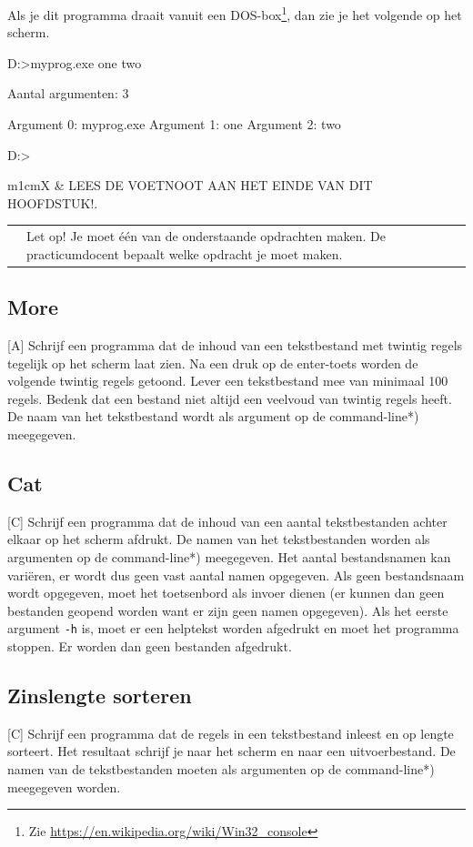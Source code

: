 \documentclass[a4paper,10pt,fleqn,twoside]{article}
\newcommand{\letop}{%
\vspace{4ex plus 1ex minus 1ex}
\begin{mdframed}[outerlinewidth = 1 ,%
roundcorner = 4 pt,%
leftmargin = 40,%
rightmargin = 40,%
backgroundcolor = yellow!40,%
outerlinecolor = red!70!black,%
innertopmargin = \topskip,%
splittopskip = \topskip,%
]
\begin{tabularx}{\linewidth}{m{1cm}X}
\Large\leftpointright & Let op! Je moet één van de onderstaande opdrachten maken. De practicumdocent bepaalt welke opdracht je moet maken.
\end{tabularx}
\end{mdframed}
\vspace{4ex plus 1ex minus 1ex}
}
\newcommand{\leesvoetnoot}{%
\vspace{4ex plus 1ex minus 1ex}
\begin{mdframed}[outerlinewidth = 1 ,%
roundcorner = 4 pt,%
leftmargin = 40,%
rightmargin = 40,%
backgroundcolor = yellow!40,%
outerlinecolor = red!70!black,%
innertopmargin = \topskip,%
splittopskip = \topskip,%
]
\begin{tabularx}{\linewidth}{m{1cm}X}
\Large\leftpointright & LEES DE VOETNOOT AAN HET EINDE VAN DIT HOOFDSTUK!.
\end{tabularx}
\end{mdframed}
\vspace{4ex plus 1ex minus 1ex}
}
\begin{document}
Als je dit programma draait vanuit een DOS-box\footnote{Zie \url{https://en.wikipedia.org/wiki/Win32_console}}, dan zie je het volgende op het scherm.

%
%
%

\begin{dosbox}
D:\PROJECTS\VS\myprog\Debug>myprog.exe one two

Aantal argumenten: 3

Argument 0: myprog.exe
Argument 1: one
Argument 2: two

D:\PROJECTS\VS\myprog\Debug>
\end{dosbox}

\leesvoetnoot
\letop
\clearpage

\subsection{More}[A]
Schrijf een programma dat de inhoud van een tekstbestand met twintig regels tegelijk op het scherm laat zien. Na een druk op de enter-toets worden de volgende twintig regels getoond. Lever een tekstbestand mee van minimaal 100 regels. Bedenk dat een bestand niet altijd een veelvoud van twintig regels heeft. De naam van het tekstbestand wordt als argument op de command-line*) meegegeven.

\subsection{Cat}[C]
Schrijf een programma dat de inhoud van een aantal tekstbestanden achter elkaar op het scherm afdrukt. De namen van het tekstbestanden worden als argumenten op de command-line*) meegegeven. Het aantal bestandsnamen kan variëren, er wordt dus geen vast aantal namen opgegeven. Als geen bestandsnaam wordt opgegeven, moet het toetsenbord als invoer dienen (er kunnen dan geen bestanden geopend worden want er zijn geen namen opgegeven). Als het eerste argument \lstinline|-h| is, moet
er een helptekst worden afgedrukt en moet het programma stoppen. Er worden dan geen bestanden afgedrukt.

\subsection{Zinslengte sorteren}[C]
Schrijf een programma dat de regels in een tekstbestand inleest en op lengte sorteert. Het resultaat schrijf je naar het scherm en naar een uitvoerbestand. De namen van de tekstbestanden moeten als argumenten op de command-line*) meegegeven worden.
\end{document}
